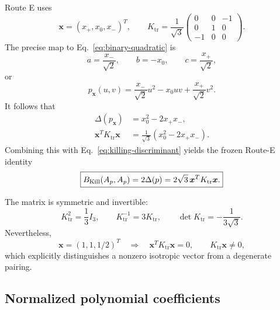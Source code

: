 \documentclass[11pt]{article}
\numberwithin{equation}{section}
\newcommand{\Ktr}{K_{\mathrm{tr}}}
\begin{document}
Route E uses
\begin{equation}
 \bm x=(x_+,x_0,x_-)^T,
 \qquad
 \Ktr=\frac1{\sqrt3}
 \begin{pmatrix}
 0&0&-1\\
 0&1&0\\
 -1&0&0
 \end{pmatrix}.
 \label{eq:route-e-k}
\end{equation}
The precise map to Eq.~\eqref{eq:binary-quadratic} is
\begin{equation}
 a=\frac{x_-}{\sqrt2},
 \qquad b=-x_0,
 \qquad c=\frac{x_+}{\sqrt2},
 \label{eq:spherical-map}
\end{equation}
or
\begin{equation}
 p_{\bm x}(u,v)
 =\frac{x_-}{\sqrt2}u^2-x_0uv+\frac{x_+}{\sqrt2}v^2.
 \label{eq:spherical-polynomial}
\end{equation}
It follows that
\begin{align}
 \Delta(p_{\bm x})
 &=x_0^2-2x_+x_-,\\
 \bm x^T\Ktr\bm x
 &=\frac1{\sqrt3}(x_0^2-2x_+x_-).
 \label{eq:spherical-contact}
\end{align}
Combining this with Eq.~\eqref{eq:killing-discriminant} yields the frozen
Route-E identity
\begin{equation}
 \boxed{
 B_{\rm Kill}(A_p,A_p)
 =2\Delta(p)
 =2\sqrt3\,\bm x^T\Ktr\bm x.}
 \label{eq:route-e-master}
\end{equation}

The matrix is symmetric and invertible:
\begin{equation}
 \Ktr^2=\frac13I_3,
 \qquad \Ktr^{-1}=3\Ktr,
 \qquad \det\Ktr=-\frac1{3\sqrt3}.
 \label{eq:k-properties}
\end{equation}
Nevertheless,
\begin{equation}
 \bm x=(1,1,1/2)^T
 \quad\Longrightarrow\quad
 \bm x^T\Ktr\bm x=0,
 \qquad \Ktr\bm x\ne0,
 \label{eq:isotropic-example}
\end{equation}
which explicitly distinguishes a nonzero isotropic vector from a degenerate
pairing.

\subsection{Normalized polynomial coefficients}
\end{document}

